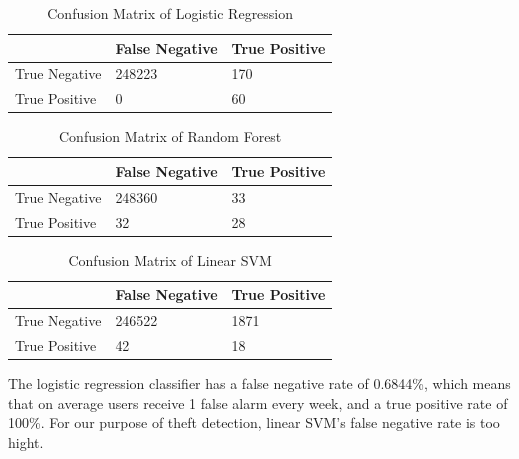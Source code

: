 \documentclass{soups}
\begin{document}
\begin{table}[H]
\centering
\begin{tabular}{@{}lll@{}}
\toprule
              & False Negative & True Positive \\ \midrule
True Negative & 248223         & 170           \\
True Positive & 0              & 60            \\ \bottomrule
\end{tabular}
\caption{Confusion Matrix of Logistic Regression}
\label{my-label}
\end{table}

\begin{table}[H]
\centering
\begin{tabular}{@{}lll@{}}
\toprule
              & False Negative & True Positive \\ \midrule
True Negative & 248360          & 33           \\
True Positive & 32              & 28           \\ \bottomrule
\end{tabular}
\caption{Confusion Matrix of Random Forest}
\label{my-label}
\end{table}

\begin{table}[H]
\centering
\begin{tabular}{@{}lll@{}}
\toprule
              & False Negative & True Positive \\ \midrule
True Negative & 246522         & 1871          \\
True Positive & 42             & 18            \\ \bottomrule
\end{tabular}
\caption{Confusion Matrix of Linear SVM}
\label{my-label}
\end{table}


The logistic regression classifier has a false negative rate of 0.6844\%, which means that on average users receive 1 false alarm every week, and a true positive rate of 100\%. For our purpose of theft detection, linear SVM's false negative rate is too hight.
\end{document}
